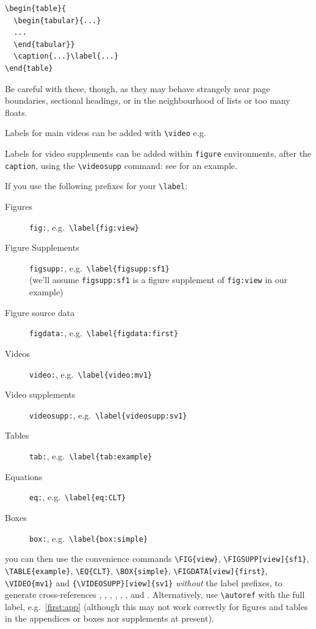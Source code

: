 \documentclass[9pt,lineno]{elife}
\begin{document}
\begin{verbatim}
\begin{table}{
  \begin{tabular}{...}
  ...
  \end{tabular}}
  \caption{...}\label{...}
\end{table}
\end{verbatim}

Be careful with these, though, as they may behave strangely near page boundaries, sectional headings, or in the neighbourhood of lists or too many floats.

Labels for main videos can be added with \verb|\video| e.g.

\label{video:mv1}

Labels for video supplements can be added within \texttt{figure} environments, after the \texttt{caption}, using the \verb|\videosupp| command: see  for an example.

If you use the following prefixes for your \verb|\label|:
%
\begin{description}
\item[Figures] \texttt{fig:}, e.g.~\verb|\label{fig:view}|
\item[Figure Supplements] \texttt{figsupp:}, e.g.~\verb|\label{figsupp:sf1}|\\
(we'll assume \texttt{figsupp:sf1} is a figure supplement of \texttt{fig:view} in our example)
\item[Figure source data] \texttt{figdata:}, e.g.~\verb|\label{figdata:first}|
\item[Videos] \texttt{video:}, e.g.~\verb|\label{video:mv1}|
\item[Video supplements] \texttt{videosupp:}, e.g.~\verb|\label{videosupp:sv1}|
\item[Tables] \texttt{tab:}, e.g.~\verb|\label{tab:example}|
\item[Equations] \texttt{eq:}, e.g.~\verb|\label{eq:CLT}|
\item[Boxes] \texttt{box:}, e.g.~\verb|\label{box:simple}|
\end{description}
%
you can then use the convenience commands \verb|\FIG{view}|, \verb|\FIGSUPP[view]{sf1}|, \verb|\TABLE{example}|, \verb|\EQ{CLT}|, \verb|\BOX{simple}|, \verb|\FIGDATA[view]{first}|, \verb|\VIDEO{mv1}| and \verb|{\VIDEOSUPP}[view]{sv1}| \emph{without} the label prefixes, to generate cross-references , ,  , , , ,  and . Alternatively, use \verb|\autoref| with the full label, e.g.~\autoref{first:app} (although this may not work correctly for figures and tables in the appendices or boxes nor supplements at present).
\end{document}
